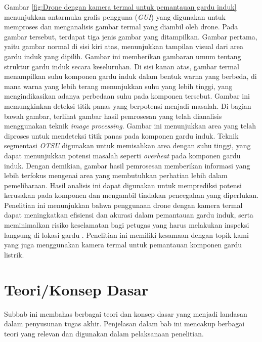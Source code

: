 Gambar \ref{fig:Drone dengan kamera termal untuk pemantauan gardu induk} menunjukkan antarmuka grafis pengguna (\emph{GUI}) yang digunakan untuk memproses dan menganalisis gambar termal yang diambil oleh drone. Pada gambar tersebut, terdapat tiga jenis gambar yang ditampilkan. Gambar pertama, yaitu gambar normal di sisi kiri atas, menunjukkan tampilan visual dari area gardu induk yang dipilih. Gambar ini memberikan gambaran umum tentang struktur gardu induk secara keseluruhan. Di sisi kanan atas, gambar termal menampilkan suhu komponen gardu induk dalam bentuk warna yang berbeda, di mana warna yang lebih terang menunjukkan suhu yang lebih tinggi, yang mengindikasikan adanya perbedaan suhu pada komponen tersebut. Gambar ini memungkinkan deteksi titik panas yang berpotensi menjadi masalah.  Di bagian bawah gambar, terlihat gambar hasil pemrosesan yang telah dianalisis menggunakan teknik \emph{image processing}. Gambar ini menunjukkan area yang telah diproses untuk mendeteksi titik panas pada komponen gardu induk. Teknik segmentasi \emph{OTSU} digunakan untuk memisahkan area dengan suhu tinggi, yang dapat menunjukkan potensi masalah seperti \emph{overheat} pada komponen gardu induk. Dengan demikian, gambar hasil pemrosesan memberikan informasi yang lebih terfokus mengenai area yang membutuhkan perhatian lebih dalam pemeliharaan. Hasil analisis ini dapat digunakan untuk memprediksi potensi kerusakan pada komponen dan mengambil tindakan pencegahan yang diperlukan. Penelitian ini menunjukkan bahwa penggunaan drone dengan kamera termal dapat meningkatkan efisiensi dan akurasi dalam pemantauan gardu induk, serta meminimalkan risiko keselamatan bagi petugas yang harus melakukan inspeksi langsung di lokasi gardu \cite{Prieto2022}. Penelitian ini memiliki kesamaan dengan topik kami yang juga menggunakan kamera termal untuk pemantauan komponen gardu listrik.



\section{Teori/Konsep Dasar}
Subbab ini membahas berbagai teori dan konsep dasar yang menjadi landasan dalam penyusunan tugas akhir. Penjelasan dalam bab ini mencakup berbagai teori yang relevan dan digunakan dalam pelaksanaan penelitian.

